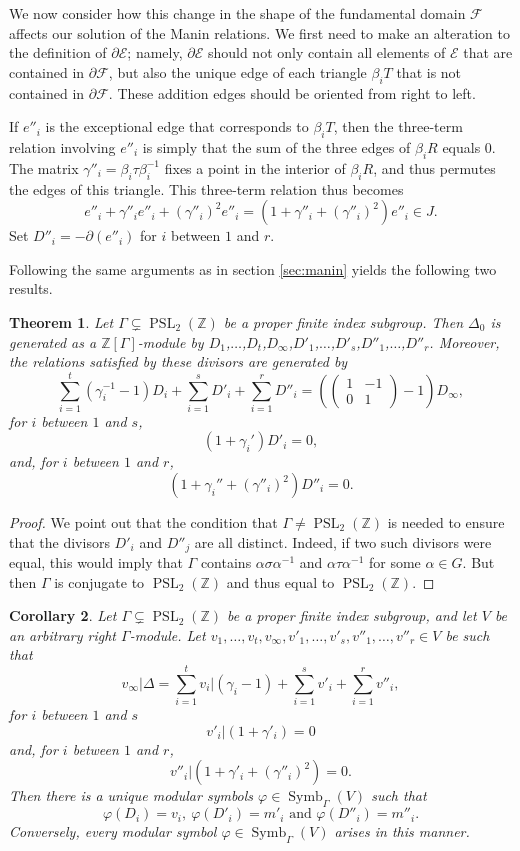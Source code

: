 \documentclass{amsart}
\theoremstyle{plain}
\newtheorem{thm}{Theorem}[section]
\newtheorem{cor}[thm]{Corollary}
\theoremstyle{definition}
\newcommand{\E}{{\mathcal E}}
\newcommand{\F}{{\mathcal F}}
\newcommand{\Z}{{\mathbb Z}}
\newcommand{\psmallmat}[4]{\left( \begin{smallmatrix} #1 & #2 \\ #3 & #4 \end{smallmatrix} \right)}
\DeclareMathOperator{\PSL}{PSL}
\DeclareMathOperator{\Symb}{Symb}
\newcommand{\MS}[1]{\Symb_{\Gamma}(#1)}
\begin{document}
We now consider how this change in the shape of the fundamental
domain $\F$ affects our solution of the Manin relations. We first
need to make an alteration to the definition of $\partial \E$;
namely, $\partial \E$ should not only contain all elements of $\E$
that are contained in $\partial \F$, but also the unique edge of
each triangle $\beta_i T$ that is not contained in $\partial
\F$. These addition edges should be oriented from right to left.

If $e''_i$ is the exceptional edge that corresponds to $\beta_i T$, then the three-term relation involving $e''_i$ is simply that the sum of the three edges of $\beta_i R$ equals 0.  The matrix $\gamma''_i = \beta_i
\tau \beta_i^{-1}$ fixes a point in the interior of $\beta_i R$, and thus permutes the edges of this triangle.  This three-term relation thus becomes
$$
e''_i + \gamma''_i e''_i + (\gamma''_i)^2 e''_i = (1 + \gamma''_i  + (\gamma''_i)^2) e''_i
\in J.
$$
Set $D''_i = -\partial(e''_i)$ for $i$ between $1$ and $r$.

Following the same arguments as in section \ref{sec:manin} yields
the following two results.

\begin{thm}
\label{thm:3tor}
Let $\Gamma \subsetneq \PSL_2(\Z)$ be a proper finite index subgroup.
Then $\Delta_0$ is generated as a $\Z[\Gamma]$-module by $D_1$,$\dots$,$D_t$,$D_\infty$,$D'_1$,$\dots$,$D'_s$,$D''_1$,$\dots$,$D''_r$.  Moreover, the relations satisfied by these
divisors are generated by
$$
\sum_{i=1}^t (\gamma_i^{-1}-1) D_i + \sum_{i=1}^s D'_i + \sum_{i=1}^r D''_i
= \left (\psmallmat{1}{-1}{0}{1} - 1\right) D_\infty,
$$
for $i$ between $1$ and $s$,
$$
(1 + \gamma_i') D'_i = 0,
$$
and, for $i$ between $1$ and $r$,
$$
(1 + \gamma_i'' + (\gamma''_i)^2) D''_i = 0.
$$
\end{thm}

\begin{proof}
We point out that the condition that $\Gamma \neq \PSL_2(\Z)$ is needed
to ensure that the divisors $D'_i$ and $D''_j$ are all distinct.
Indeed, if two such divisors were equal, this would imply that
$\Gamma$ contains $\alpha \sigma \alpha^{-1}$ and $\alpha \tau
\alpha^{-1}$ for some $\alpha \in G$.  But then $\Gamma$ is
conjugate to $\PSL_2(\Z)$ and thus equal to $\PSL_2(\Z)$.
\end{proof}

\begin{cor}
\label{cor:msgen} 
Let $\Gamma \subsetneq \PSL_2(\Z)$ be a proper finite index subgroup, and let $V$ be an arbitrary right $\Gamma$-module. Let $v_1, \dots, v_t, v_\infty, v'_1, \dots, v'_s, v''_1, \dots, v''_r \in V$ be such that
$$
v_\infty\big| \Delta = \sum_{i=1}^t v_i\big| (\gamma_i-1) +
\sum_{i=1}^s v'_i + \sum_{i=1}^r v''_i,
$$
for $i$ between $1$ and $s$
$$
v'_i\big| (1+ \gamma'_i) = 0
$$
and, for $i$ between $1$ and $r$,
$$
v''_i\big| (1+ \gamma'_i+(\gamma''_i)^{2}) = 0.
$$
Then there is a unique modular symbols $\varphi \in \MS{V}$ such
that 
$$
\varphi(D_i) = v_i, ~ \varphi(D'_i) = m'_i \text{~and~}
\varphi(D''_i) = m''_i.
$$
Conversely, every modular symbol
$\varphi \in \MS{V}$ arises in this manner.
\end{cor}
\end{document}
